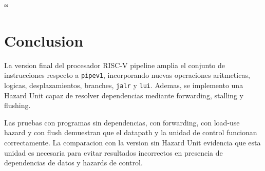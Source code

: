 \documentclass[12pt,a4paper]{report}
\begin{document}
≈
\section{Conclusion}

La version final del procesador RISC-V pipeline amplia el conjunto de instrucciones respecto a \texttt{pipev1}, incorporando nuevas operaciones aritmeticas, logicas, desplazamientos, branches, \texttt{jalr} y \texttt{lui}. Ademas, se implemento una Hazard Unit capaz de resolver dependencias mediante forwarding, stalling y flushing.

Las pruebas con programas sin dependencias, con forwarding, con load-use hazard y con flush demuestran que el datapath y la unidad de control funcionan correctamente. La comparacion con la version sin Hazard Unit evidencia que esta unidad es necesaria para evitar resultados incorrectos en presencia de dependencias de datos y hazards de control.
\end{document}
